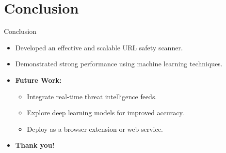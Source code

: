 \documentclass{beamer}
\begin{document}
\section{Conclusion}
\begin{frame}{Conclusion}
  \begin{itemize}
    \item Developed an effective and scalable URL safety scanner.
    \item Demonstrated strong performance using machine learning techniques.
    \item \textbf{Future Work:}
      \begin{itemize}
        \item Integrate real-time threat intelligence feeds.
        \item Explore deep learning models for improved accuracy.
        \item Deploy as a browser extension or web service.
      \end{itemize}
    \item \textbf{Thank you!}
  \end{itemize}
\end{frame}

\end{document}
